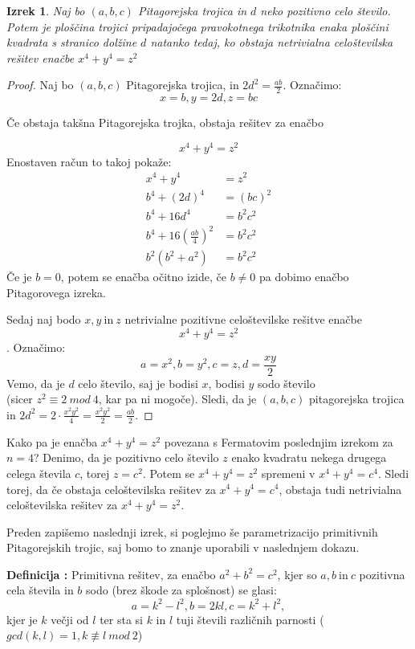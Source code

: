 \documentclass[a4paper, 10pt]{article}
\newtheorem{izr}{Izrek}
\newcounter{defcount}
\newenvironment{definicija}{\begin{flushleft}\stepcounter{defcount}\textbf{Definicija \arabic{defcount}:}}{\hfill\end{flushleft}}
\begin{document}
\begin{izr}
Naj bo $(a, b, c)$ Pitagorejska trojica in $d$ neko pozitivno celo število. Potem je ploščina trojici pripadajočega pravokotnega trikotnika enaka ploščini kvadrata s stranico dolžine $d$ natanko tedaj, ko obstaja netrivialna celoštevilska rešitev enačbe $x^4 + y^4 = z^2$
\end{izr}
\begin{proof}
Naj bo $(a, b, c)$ Pitagorejska trojica, in $2d^2 = \frac{ab}{2}$. Označimo:
\[
x = b, y = 2d, z = bc
\]

Če obstaja takšna Pitagorejska trojka, obstaja rešitev za enačbo 

\[
x^4 + y^4 = z^2
\]
Enostaven račun to takoj pokaže:
\begin{align*}
x^4 + y^4 &= z^2 \\
b^4 + (2d)^4 &= (bc)^2 \\
b^4 + 16d^4 &= b^2c^2 \\
b^4 + 16(\frac{ab}{4})^2 &= b^2c^2 \\
b^2(b^2 + a^2) &= b^2c^2 
\end{align*}
Če je $b=0$, potem se enačba očitno izide, če $b\neq 0$ pa dobimo enačbo Pitagorovega izreka.


Sedaj naj bodo $x, y~\text{in}~z$ netrivialne pozitivne celoštevilske rešitve enačbe \[x^4 + y^4 = z^2\].
Označimo:
\[
a = x^2, b = y^2, c = z, d =\frac{xy}{2}
\]
Vemo, da je $d$ celo število, saj je bodisi $x$, bodisi $y$ sodo število \\ (sicer $z^2 \equiv 2~mod~4$, kar pa ni mogoče).
Sledi, da je $(a, b, c)$ pitagorejska trojica in $2d^2 = 2 \cdot \frac{x^2y^2}{4} = \frac{x^2y^2}{2} = \frac{ab}{2}$.
\end{proof}

Kako pa je enačba $x^4 + y^4 = z^2$ povezana s Fermatovim poslednjim izrekom za $n=4$? Denimo, da je pozitivno celo število $z$ enako kvadratu nekega drugega celega števila $c$, torej $z=c^2$. Potem se $x^4 + y^4 = z^2$ spremeni v $x^4 + y^4 = c^4$. Sledi torej, da  če obstaja celoštevilska rešitev za $x^4 + y^4 = c^4$, obstaja tudi netrivialna celoštevilska rešitev za $x^4 + y^4 = z^2$.

Preden zapišemo naslednji izrek, si poglejmo še parametrizacijo primitivnih Pitagorejskih trojic, saj bomo to znanje uporabili v naslednjem dokazu.
\begin{definicija}
Primitivna rešitev, za enačbo $a^2 + b^2 = c^2$, kjer so $a, b~\text{in}~c$ pozitivna cela števila in $b$ sodo (brez škode za splošnost) se glasi:
\[
a = k^2 - l^2, b=2kl, c = k^2 + l^2,
\]
kjer je $k$ večji od $l$ ter sta si $k$ in $l$ tuji števili različnih parnosti ($gcd(k, l) = 1, k \not\equiv l~mod~2$)

\end{definicija}
\end{document}
